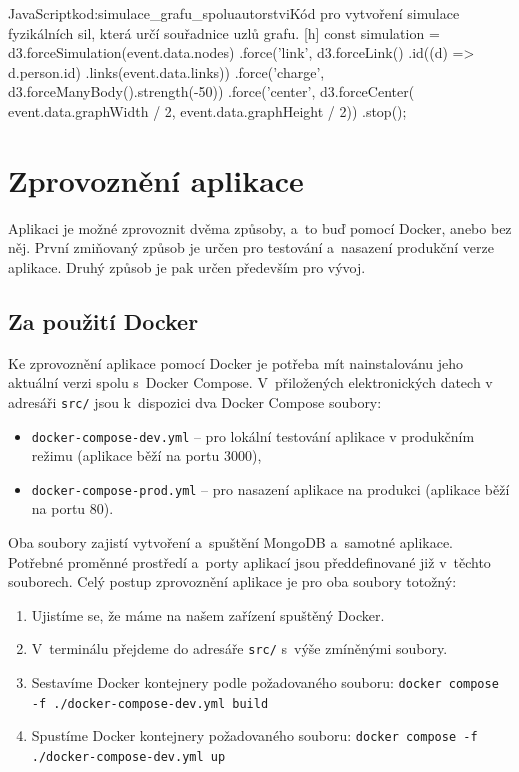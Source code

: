\documentclass[
  biblatex,
  sourcecodes,
  glossaries,
  index
]{kidiplom}
\begin{document}
\begin{kicode}{JavaScript}{kod:simulace_grafu_spoluautorstvi}{Kód pro vytvoření simulace fyzikálních sil, která určí souřadnice uzlů grafu.} [h]
const simulation = d3.forceSimulation(event.data.nodes)
    .force('link', d3.forceLink()
        .id((d) => d.person.id)
        .links(event.data.links))
    .force('charge', d3.forceManyBody().strength(-50))
    .force('center', d3.forceCenter(
        event.data.graphWidth / 2,
        event.data.graphHeight / 2))
    .stop();
\end{kicode}

\newpage

\section{Zprovoznění aplikace}

Aplikaci je možné zprovoznit dvěma způsoby, a~to buď pomocí Docker, anebo bez něj. První zmiňovaný způsob je určen pro testování a~nasazení produkční verze aplikace. Druhý způsob je pak určen především pro vývoj.

\subsection{Za použití Docker}

Ke zprovoznění aplikace pomocí Docker je potřeba mít nainstalovánu jeho aktuální verzi spolu s~Docker Compose. V~přiložených elektronických datech v adresáři \texttt{src/} jsou k~dispozici dva Docker Compose soubory:

\begin{itemize}
\item \texttt{docker-compose-dev.yml} -- pro lokální testování aplikace v produkčním režimu (aplikace běží na portu 3000),
\item \texttt{docker-compose-prod.yml} -- pro nasazení aplikace na produkci (aplikace běží na portu 80).
\end{itemize}

Oba soubory zajistí vytvoření a~spuštění MongoDB a~samotné aplikace. Potřebné proměnné prostředí a~porty aplikací jsou předdefinované již v~těchto souborech. Celý postup zprovoznění aplikace je pro oba soubory totožný:

\begin{enumerate}
\item Ujistíme se, že máme na našem zařízení spuštěný Docker.
\item V~terminálu přejdeme do adresáře \texttt{src/} s~výše zmíněnými soubory.
\item Sestavíme Docker kontejnery podle požadovaného souboru:\vspace{2mm}\newline
\texttt{docker compose -f ./docker-compose-dev.yml build}
\item Spustíme Docker kontejnery požadovaného souboru:
\vspace{2mm}\newline
\texttt{docker compose -f ./docker-compose-dev.yml up}
\end{enumerate}
\end{document}

